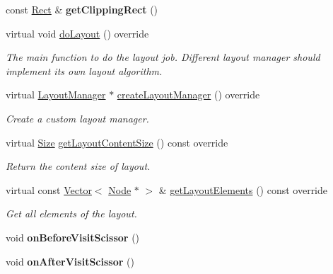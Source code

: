 \begin{DoxyCompactItemize}
\mbox{\label{classui_1_1Layout_afab3d1f012120f098461fc51a189f093}} 
const \hyperlink{classRect}{Rect} \& {\bfseries get\+Clipping\+Rect} ()
\item 
\mbox{\label{classui_1_1Layout_acf56bff884a6abb2466dddb4ea8b1899}} 
virtual void \hyperlink{classui_1_1Layout_acf56bff884a6abb2466dddb4ea8b1899}{do\+Layout} () override
\begin{DoxyCompactList}\small\item\em The main function to do the layout job. Different layout manager should implement its own layout algorithm. \end{DoxyCompactList}\item 
virtual \hyperlink{classui_1_1LayoutManager}{Layout\+Manager} $\ast$ \hyperlink{classui_1_1Layout_ade857c1e220dc8b5844966e2c37b7a1f}{create\+Layout\+Manager} () override
\begin{DoxyCompactList}\small\item\em Create a custom layout manager. \end{DoxyCompactList}\item 
virtual \hyperlink{classSize}{Size} \hyperlink{classui_1_1Layout_a75eb33c244061dd6ab91a37536fd5b8f}{get\+Layout\+Content\+Size} () const override
\begin{DoxyCompactList}\small\item\em Return the content size of layout. \end{DoxyCompactList}\item 
virtual const \hyperlink{classVector}{Vector}$<$ \hyperlink{classNode}{Node} $\ast$ $>$ \& \hyperlink{classui_1_1Layout_ab80ee89eff7fa311e237e63d72bb18c7}{get\+Layout\+Elements} () const override
\begin{DoxyCompactList}\small\item\em Get all elements of the layout. \end{DoxyCompactList}\item 
\mbox{\label{classui_1_1Layout_abfbda1edc76f947f99ab46ce225d9559}} 
void {\bfseries on\+Before\+Visit\+Scissor} ()
\item 
\mbox{\label{classui_1_1Layout_a45958ebbb2bf7b40f111ff4bc886c770}} 
void {\bfseries on\+After\+Visit\+Scissor} ()
\item 
\mbox{\label{classui_1_1Layout_a58c1f81d4aab6ee26b753ed8419cb810}} 

\end{DoxyCompactItemize}
